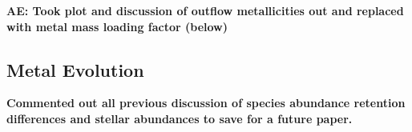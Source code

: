 \documentclass[twocolumn]{aastex61}
\begin{document}
\textbf{AE: Took plot and discussion of outflow metallicities out and replaced with metal mass loading factor (below)}


\subsection{Metal Evolution} 
\label{sec:chemical evolution}
\textbf{Commented out all previous discussion of species abundance retention differences and stellar abundances to save for a future paper.}
\end{document}
